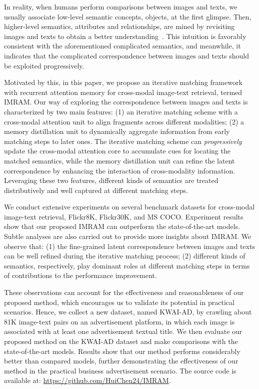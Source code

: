 \documentclass[10pt,twocolumn,letterpaper]{article}
\newcommand{\Ads}{KWAI-AD}
\begin{document}
In reality, when humans perform comparisons between images and texts, we usually associate low-level semantic concepts, \eg{} objects, at the first glimpse. Then, higher-level semantics, \eg{} attributes and relationships, are mined by revisiting images and texts to obtain a better understanding~\cite{perlovsky2011language}. This intuition is favorably consistent with the aforementioned complicated semantics, and meanwhile, it indicates that the complicated correspondence between images and texts should be exploited progressively.

Motivated by this, in this paper, we propose an iterative matching framework with recurrent attention memory for cross-modal image-text retrieval, termed IMRAM. Our way of exploring the correspondence between images and texts is characterized by two main features: (1) an iterative matching scheme with a cross-modal attention unit to align fragments across different modalities; (2) a memory distillation unit to dynamically aggregate information from early matching steps to later ones. The iterative matching scheme can \textit{progressively} update the cross-modal attention core to accumulate cues for locating the matched semantics, while the memory distillation unit can refine the latent correspondence by enhancing the interaction of cross-modality information. Leveraging these two features, different kinds of semantics are treated distributively and well captured at different matching steps.

We conduct extensive experiments on several benchmark datasets for cross-modal image-text retrieval, \ie{} Flickr8K, Flickr30K, and MS COCO. Experiment results show that our proposed IMRAM can outperform the state-of-the-art models. Subtle analyses are also carried out to provide more insights about IMRAM. We observe that: (1) the fine-grained latent correspondence between images and texts can be well refined during the iterative matching process; (2) different kinds of semantics, respectively, play dominant roles at different matching steps in terms of contributions to the performance improvement. 

These observations can account for the effectiveness and reasonableness of our proposed method, which encourages us to validate its potential in practical scenarios. Hence, we collect a new dataset, named \Ads{}, by crawling about 81K image-text pairs on an advertisement platform, in which each image is associated with at least one advertisement textual title. We then evaluate our proposed method on the \Ads{} dataset and make comparisons with the state-of-the-art models. Results show that our method performs considerably better than compared models, further demonstrating the effectiveness of our method in the practical business advertisement scenario. The source code is available at: \url{https://github.com/HuiChen24/IMRAM}.
\end{document}
